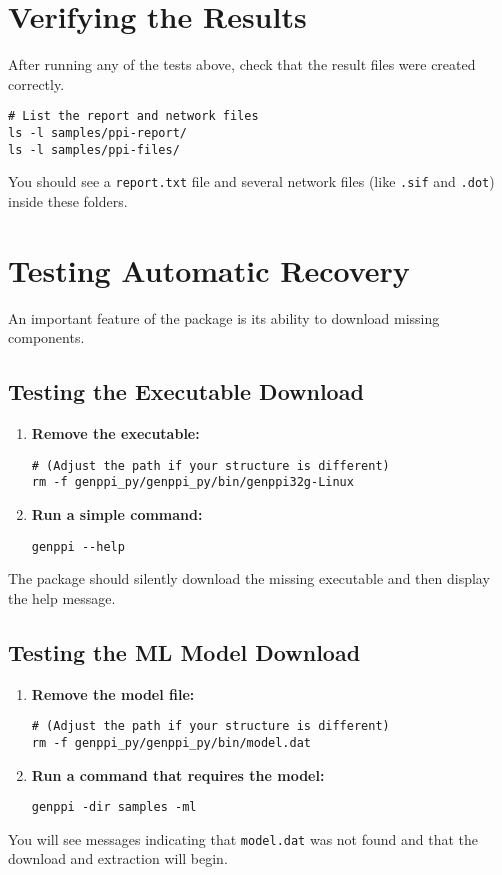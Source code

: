 \documentclass[11pt, a4paper]{article}
\begin{document}
\section{Verifying the Results}
After running any of the tests above, check that the result files were created correctly.
\begin{lstlisting}[style=bashstyle]
# List the report and network files
ls -l samples/ppi-report/
ls -l samples/ppi-files/
\end{lstlisting}
You should see a \texttt{report.txt} file and several network files (like \texttt{.sif} and \texttt{.dot}) inside these folders.

\section{Testing Automatic Recovery}
An important feature of the package is its ability to download missing components.

\subsection{Testing the Executable Download}
\begin{enumerate}
    \item \textbf{Remove the executable:}
    \begin{lstlisting}[style=bashstyle]
# (Adjust the path if your structure is different)
rm -f genppi_py/genppi_py/bin/genppi32g-Linux
    \end{lstlisting}
    \item \textbf{Run a simple command:}
    \begin{lstlisting}[style=bashstyle]
genppi --help
    \end{lstlisting}
\end{enumerate}
The package should silently download the missing executable and then display the help message.

\subsection{Testing the ML Model Download}
\begin{enumerate}
    \item \textbf{Remove the model file:}
    \begin{lstlisting}[style=bashstyle]
# (Adjust the path if your structure is different)
rm -f genppi_py/genppi_py/bin/model.dat
    \end{lstlisting}
    \item \textbf{Run a command that requires the model:}
    \begin{lstlisting}[style=bashstyle]
genppi -dir samples -ml
    \end{lstlisting}
\end{enumerate}
You will see messages indicating that \texttt{model.dat} was not found and that the download and extraction will begin.
\end{document}
